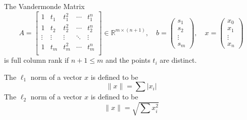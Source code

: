 \begin{theorem}[]
  The Vandermonde Matrix $$A = \begin{bmatrix}
    1 & t_1 & t_1^2 & \cdots & t_1^n\\
    1 & t_2 & t_2^2 & \cdots & t_2^n\\
    \vdots & \vdots & \vdots & \ddots & \vdots\\
    1 & t_m & t_m^2 & \cdots & t_m^n\\
  \end{bmatrix} \in \mathbb R^{m \times (n+1)}, \quad b = \begin{pmatrix}
    s_1 \\ s_2 \\ \vdots \\ s_m
  \end{pmatrix}, \quad x = \begin{pmatrix}
    x_0 \\ x_1 \\ \vdots \\ x_n
  \end{pmatrix}$$
  is full column rank if $n + 1 \leq m$ and the points $t_i$ are distinct.
\end{theorem}
\begin{definition}
  The $\ell_1$ norm of a vector $x$ is defined to be $$\|x \| = \sum |x_i|$$
  The $\ell_2$ norm of a vector $x$ is defined to be $$\|x \| = \sqrt{\sum x_i^2}$$
\end{definition}
